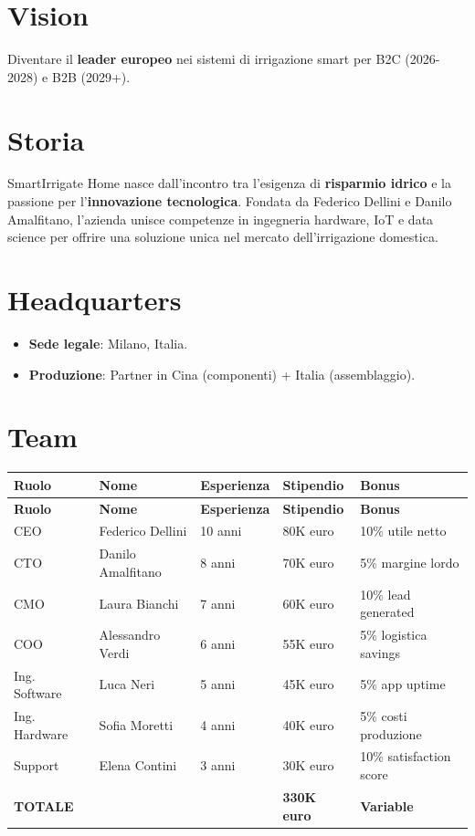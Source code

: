 \documentclass[11pt,a4paper]{report}
\begin{document}
\section{Vision}
Diventare il {\bf leader europeo} nei sistemi di irrigazione smart per B2C (2026-2028) e B2B (2029+).

\section{Storia}
SmartIrrigate Home nasce dall'incontro tra l'esigenza di {\bf risparmio idrico} e la passione per l'{\bf innovazione tecnologica}. Fondata da Federico Dellini e Danilo Amalfitano, l'azienda unisce competenze in ingegneria hardware, IoT e data science per offrire una soluzione unica nel mercato dell'irrigazione domestica.

\section{Headquarters}
\begin{itemize}
\item {\bf Sede legale}: Milano, Italia.
\item {\bf Produzione}: Partner in Cina (componenti) + Italia (assemblaggio).
\end{itemize}

\section{Team}
\begin{longtable}{|L{2cm}|L{2.5cm}|L{2.5cm}|C{1.4cm}|L{2cm}|}
\hline
{\bf Ruolo} & {\bf Nome} & {\bf Esperienza} & {\bf Stipendio} & {\bf Bonus} \\
\hline
\endfirsthead
\hline
{\bf Ruolo} & {\bf Nome} & {\bf Esperienza} & {\bf Stipendio} & {\bf Bonus} \\
\hline
\endhead
\endfoot
\endlastfoot
CEO & Federico Dellini & 10 anni & 80K euro & 10\% utile netto \\
CTO & Danilo Amalfitano & 8 anni & 70K euro & 5\% margine lordo \\
CMO & Laura Bianchi & 7 anni & 60K euro & 10\% lead generated \\
COO & Alessandro Verdi & 6 anni & 55K euro & 5\% logistica savings \\
Ing. Software & Luca Neri & 5 anni & 45K euro & 5\% app uptime \\
Ing. Hardware & Sofia Moretti & 4 anni & 40K euro & 5\% costi produzione \\
Support & Elena Contini & 3 anni & 30K euro & 10\% satisfaction score \\
\hline
{\bf TOTALE} & & & {\bf 330K euro} & {\bf Variable} \\
\hline
\end{longtable}
\end{document}
